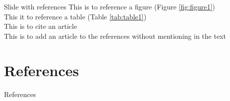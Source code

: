 \documentclass[aspectratio=169]{beamer} %
\begin{document}
\begin{frame}{Slide with references}
	This is to reference a figure (Figure \ref{fig:figure1})\\
    This it to reference a table (Table \ref{tab:table1})\\
    This is to cite an article \cite{Ahmed2018a}\\
    This is to add an article to the references without mentioning in the text \nocite{Ahmed2018a}\\
\end{frame}
\section{References}

\begin{frame}[allowframebreaks]{References}
	\tiny
	
\end{frame}
\end{document}
